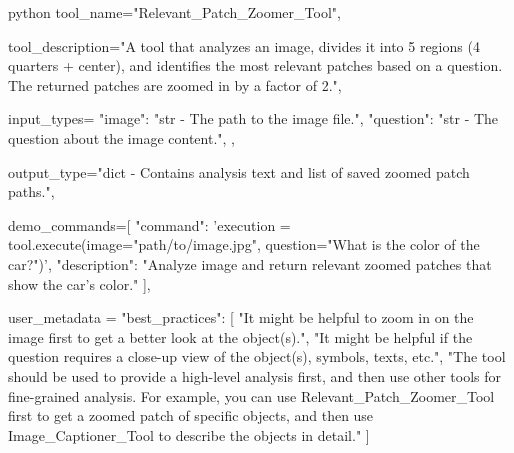 \begin{codecolorbox}{python}
tool_name="Relevant_Patch_Zoomer_Tool",

tool_description="A tool that analyzes an image, divides it into 5 regions (4 quarters + center), and identifies the most relevant patches based on a question. The returned patches are zoomed in by a factor of 2.",

input_types={
    "image": "str - The path to the image file.",
    "question": "str - The question about the image content.",
},

output_type="dict - Contains analysis text and list of saved zoomed patch paths.",

demo_commands=[
    {
        "command": 'execution = tool.execute(image="path/to/image.jpg", question="What is the color of the car?")',
        "description": "Analyze image and return relevant zoomed patches that show the car's color."
    }
],

user_metadata = {
    "best_practices": [
        "It might be helpful to zoom in on the image first to get a better look at the object(s).",
        "It might be helpful if the question requires a close-up view of the object(s), symbols, texts, etc.",
        "The tool should be used to provide a high-level analysis first, and then use other tools for fine-grained analysis. For example, you can use Relevant_Patch_Zoomer_Tool first to get a zoomed patch of specific objects, and then use Image_Captioner_Tool to describe the objects in detail."
    ]
}
\end{codecolorbox}


